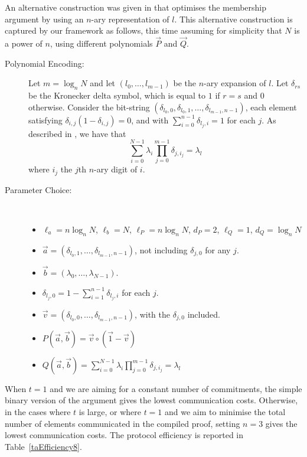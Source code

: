 An alternative construction was given in \cite{BootleCCGGP15} that optimises the membership argument by using an $n$-ary representation of $l$. This alternative construction is captured by our framework as follows, this time assuming for simplicity that $N$ is a power of $n$, using different polynomials $\vec{P}$ and $\vec{Q}$.
\begin{description}
\item[ Polynomial Encoding: ] Let $m = \log_n N$ and let $(l_0,\ldots,l_{m-1})$ be the $n$-ary expansion of $l$. Let $\delta_{rs}$ be the Kronecker delta symbol, which is equal to $1$ if $r=s$ and $0$ otherwise. Consider the bit-string $(\delta_{l_0,0},\delta_{l_0,1},\ldots,\delta_{l_{m-1},n-1})$, each element satisfying $\delta_{i,j} ( 1 - \delta_{i,j}) = 0$, and with $\sum_{i=0}^{n-1} \delta_{l_j,i} = 1$ for each $j$. As described in \cite{BootleCCGGP15}, we have that $$\sum_{i=0}^{N-1} \lambda_i \prod_{j=0}^{m-1} \delta_{j,i_j} = \lambda_l $$ where $i_j$ the $j$th $n$-ary digit of $i$.
\item[ Parameter Choice: ] \ 
\begin{itemize}
\item $\ell_a=n\log_nN$, $\ell_b=N$, $\ell_P=n\log_nN$, $d_P=2$, $\ell_Q=1$, $d_Q=\log_nN$
\item $\vec{a} = (\delta_{l_0,1},\ldots,\delta_{l_{m-1},n-1})$, not including $\delta_{j,0}$ for any $j$.
\item $\vec{b} = (\lambda_0,\ldots,\lambda_{N-1})$.
\item $\delta_{l_j,0} = 1 - \sum_{i=1}^{n-1} \delta_{l_j,i}$ for each $j$.
\item $\vec{v} = \left( \delta_{l_0,0},\ldots,\delta_{l_{m-1},n-1} \right)$, with the $\delta_{j,0}$ included.
\item $P(\vec{a},\vec{b}) = \vec{v} \circ ( \vec{1} - \vec{v} )$
\item $Q(\vec{a},\vec{b}) = \sum_{i=0}^{N-1} \lambda_i \prod_{j=0}^{m-1} \delta_{j,i_j} = \lambda_l$
\end{itemize}
\end{description}

When $t=1$ and we are aiming for a constant number of commitments, the simple binary version of the argument gives the lowest communication costs. Otherwise, in the cases where $t$ is large, or where $t=1$ and we aim to minimise the total number of elements communicated in the compiled proof, setting $n=3$ gives the lowest communication costs. The protocol efficiency is reported in Table~\ref{taEfficiency8}.

